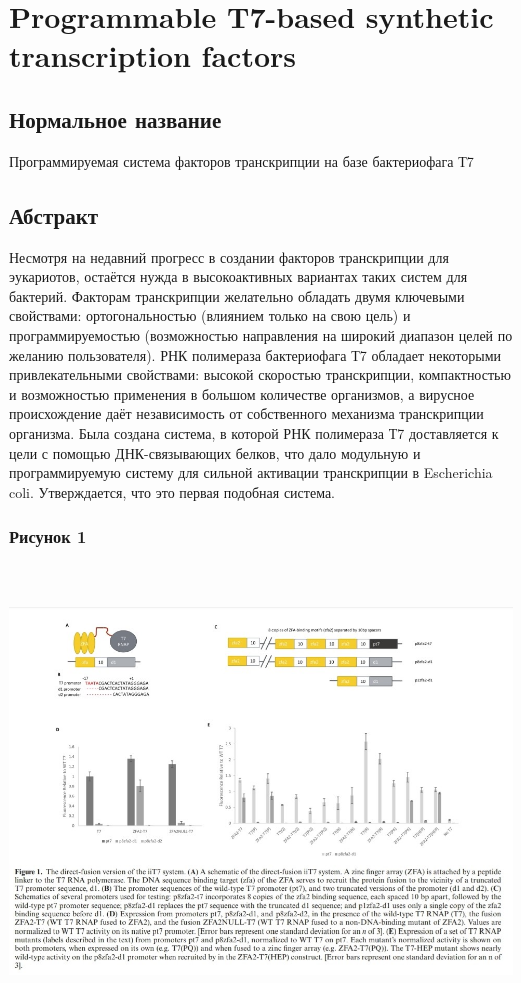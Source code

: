 \section{Programmable T7-based synthetic transcription factors}
\subsection{Нормальное название} 

Программируемая система факторов транскрипции на базе бактериофага Т7
\subsection{Абстракт}

Несмотря на недавний прогресс в создании факторов транскрипции для эукариотов, остаётся нужда в высокоактивных вариантах таких систем для бактерий. Факторам транскрипции желательно обладать двумя ключевыми свойствами: ортогональностью (влиянием только на свою цель) и программируемостью (возможностью направления на широкий диапазон целей по желанию пользователя). РНК полимераза бактериофага Т7 обладает некоторыми привлекательными свойствами: высокой скоростью транскрипции, компактностью и возможностью применения в большом количестве организмов, а вирусное происхождение даёт независимость от собственного механизма транскрипции организма. Была создана система, в которой РНК полимераза Т7 доставляется к цели с помощью ДНК-связывающих белков, что дало модульную и программируемую систему для сильной активации транскрипции в Escherichia coli. Утверждается, что это первая подобная система.

\subsubsection{Рисунок 1}

\includegraphics[width=16cm, height=12cm]{Pictures/6_1}


